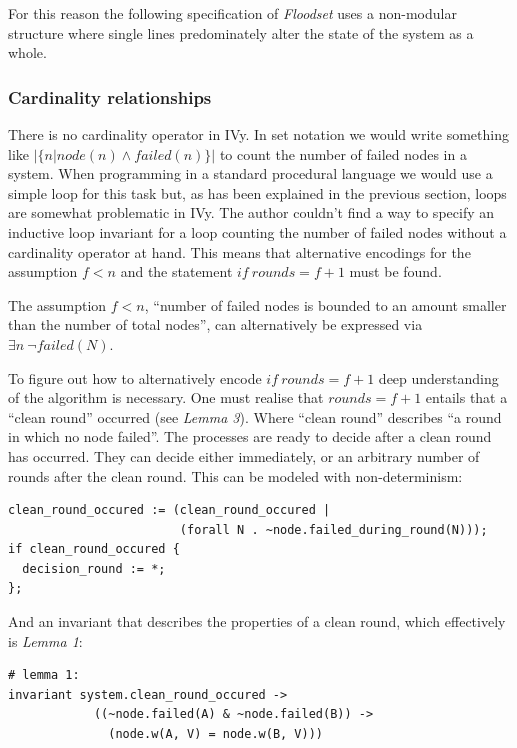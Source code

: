 \documentclass[fleqn]{article}
\begin{document}
For this reason the following specification of \textit{Floodset} uses a non-modular structure where single lines predominately alter the state of the system as a whole.


\subsubsection{Cardinality relationships}
There is no cardinality operator in IVy. In set notation we would write something like $|\{n|node(n) \land failed(n)\}|$ to count the number of failed nodes in a system. When programming in a standard procedural language we would use a simple loop for this task but, as has been explained in the previous section, loops are somewhat problematic in IVy. The author couldn't find a way to specify an inductive loop invariant for a loop counting the number of failed nodes without a cardinality operator at hand. This means that alternative encodings for the assumption $f<n$ and the statement $if\ rounds = f+1$ must be found.

The assumption $f<n$, ``number of failed nodes is bounded to an amount smaller than the number of total nodes'', can alternatively be expressed via $\exists n\ \neg failed(N)$.

To figure out how to alternatively encode $if\ rounds = f+1$ deep understanding of the algorithm is necessary. One must realise that $rounds = f+1$ entails that a ``clean round'' occurred (see \textit{Lemma 3}). Where ``clean round'' describes ``a round in which no node failed''. The processes are ready to decide after a clean round has occurred. They can decide either immediately, or an arbitrary number of rounds after the clean round. This can be modeled with non-determinism:

\begin{mdframed}[backgroundcolor=light-gray, roundcorner=10pt,leftmargin=1, rightmargin=1, innerleftmargin=15, innertopmargin=15,innerbottommargin=15, outerlinewidth=1, linecolor=light-gray]
\begin{lstlisting}
clean_round_occured := (clean_round_occured |
                        (forall N . ~node.failed_during_round(N)));
if clean_round_occured {
  decision_round := *;
};
\end{lstlisting}
\end{mdframed}

\noindent And an invariant that describes the properties of a clean round, which effectively is \textit{Lemma 1}:

\begin{mdframed}[backgroundcolor=light-gray, roundcorner=10pt,leftmargin=1, rightmargin=1, innerleftmargin=15, innertopmargin=15,innerbottommargin=15, outerlinewidth=1, linecolor=light-gray]
\begin{lstlisting}
# lemma 1:
invariant system.clean_round_occured ->
            ((~node.failed(A) & ~node.failed(B)) ->
              (node.w(A, V) = node.w(B, V)))
\end{lstlisting}
\end{mdframed}
\end{document}
